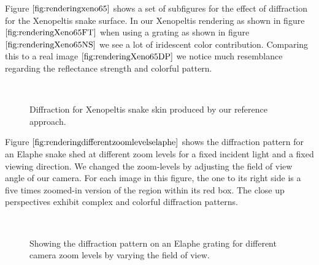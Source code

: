 Figure $\ref{fig:renderingxeno65}$ shows a set of subfigures for the effect of diffraction for the Xenopeltis snake surface. In our Xenopeltis rendering as shown in figure $\ref{fig:renderingXeno65FT}$ when using a grating as shown in figure $\ref{fig:renderingXeno65NS}$ we see a lot of iridescent color contribution. Comparing this to a real image $\ref{fig:renderingXeno65DP}$ we notice much resemblance regarding the reflectance strength and colorful pattern.

\begin{figure}[H]
  \centering

~ 
\caption[Snake Renderings: FLSS Approach for Xenopeltis Grating]{Diffraction for Xenopeltis snake skin produced by our reference approach.}
\label{fig:renderingxeno65}
\end{figure}

Figure $\ref{fig:renderingdifferentzoomlevelselaphe}$ shows the diffraction pattern for an Elaphe snake shed at different zoom levels for a fixed incident light and a fixed viewing direction. We changed the zoom-levels by adjusting the field of view angle of our camera. For each image in this figure, the one to its right side is a five times zoomed-in version of the region within its red box. The close up perspectives exhibit complex and colorful diffraction patterns. 

\begin{figure}[H]
  \centering
~
~  
  
\caption[Snake Renderings: FLSS Approach for a varying FoV]{Showing the diffraction pattern on an Elaphe grating for different camera zoom levels by varying the field of view.}
\label{fig:renderingdifferentzoomlevelselaphe}
\end{figure}

